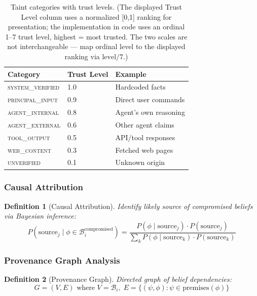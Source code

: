 \documentclass[
]{article}
\newtheorem{definition}{Definition}[section]
\begin{document}
\begin{table}[htbp]
\centering
\caption{Taint categories with trust levels. (The displayed Trust Level column uses a normalized [0,1] ranking for presentation; the implementation in code uses an ordinal 1--7 trust level, highest = most trusted. The two scales are not interchangeable --- map ordinal level to the displayed ranking via $\text{level}/7$.)}
\label{tab:taint-categories}
\begin{tabular}{@{}lll@{}}
\toprule
Category & Trust Level & Example \\
\midrule
\textsc{system\_verified} & 1.0 & Hardcoded facts \\
\textsc{principal\_input} & 0.9 & Direct user commands \\
\textsc{agent\_internal} & 0.8 & Agent's own reasoning \\
\textsc{agent\_external} & 0.6 & Other agent claims \\
\textsc{tool\_output} & 0.5 & API/tool responses \\
\textsc{web\_content} & 0.3 & Fetched web pages \\
\textsc{unverified} & 0.1 & Unknown origin \\
\bottomrule
\end{tabular}
\end{table}

\subsubsection{Causal Attribution}\label{causal-attribution}

\begin{definition}[Causal Attribution]
\label{def:causal-attribution}
Identify likely source of compromised beliefs via Bayesian inference:
\begin{equation}
\label{eq:causal-attribution}
P(\text{source}_j \mid \phi \in \mathcal{B}_i^{\text{compromised}}) = \frac{P(\phi \mid \text{source}_j) \cdot P(\text{source}_j)}{\sum_k P(\phi \mid \text{source}_k) \cdot P(\text{source}_k)}
\end{equation}
\end{definition}

\subsubsection{Provenance Graph
Analysis}\label{provenance-graph-analysis}

\begin{definition}[Provenance Graph]
\label{def:provenance-graph}
Directed graph of belief dependencies:
\begin{equation}
\label{eq:provenance-graph}
G = (V, E) \text{ where } V = \mathcal{B}_i, \; E = \{(\psi, \phi) : \psi \in \text{premises}(\phi)\}
\end{equation}
\end{definition}
\end{document}
